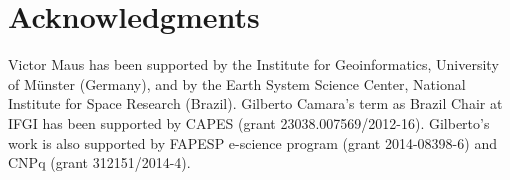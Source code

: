 \documentclass[article,shortnames]{jss}
\begin{document}
\section*{Acknowledgments}

Victor Maus has been supported by the Institute for Geoinformatics,
University of Münster (Germany), and by the Earth System Science Center,
National Institute for Space Research (Brazil). Gilberto Camara's term
as Brazil Chair at IFGI has been supported by CAPES (grant
23038.007569/2012-16). Gilberto's work is also supported by FAPESP
e-science program (grant 2014-08398-6) and CNPq (grant 312151/2014-4).


\end{document}
